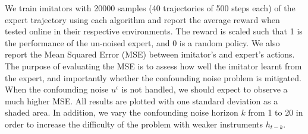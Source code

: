 We train imitators with 20000 samples (40 trajectories of 500 steps each) of the expert trajectory using each algorithm and report the average reward when tested online in their respective environments. The reward is scaled such that 1 is the performance of the un-noised expert, and 0 is a random policy. We also report the Mean Squared Error (MSE) between imitator's and expert's actions. The purpose of evaluating the MSE is to assess how well the imitator learnt from the expert, and importantly whether the confounding noise problem is mitigated. When the confounding noise $u^\epsilon$ is not handled, we should expect to observe a much higher MSE. All results are plotted with one standard deviation as a shaded area. In addition, we vary the confounding noise horizon $k$ from 1 to 20 in order to increase the difficulty of the problem with weaker instruments $h_{t-k}$.


